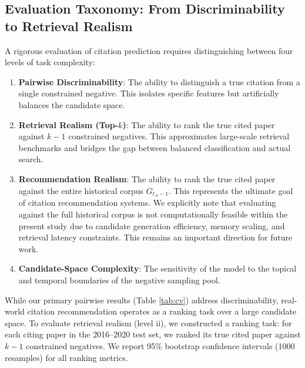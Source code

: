 \documentclass[11pt,a4paper]{article}
\begin{document}
\subsection{Evaluation Taxonomy: From Discriminability to Retrieval Realism}
A rigorous evaluation of citation prediction requires distinguishing between four levels of task complexity:
\begin{enumerate}
    \item \textbf{Pairwise Discriminability}: The ability to distinguish a true citation from a single constrained negative. This isolates specific features but artificially balances the candidate space.
    \item \textbf{Retrieval Realism (Top-$k$)}: The ability to rank the true cited paper against $k-1$ constrained negatives. This approximates large-scale retrieval benchmarks and bridges the gap between balanced classification and actual search.
    \item \textbf{Recommendation Realism}: The ability to rank the true cited paper against the entire historical corpus $G_{t_A-1}$. This represents the ultimate goal of citation recommendation systems. We explicitly note that evaluating against the full historical corpus is not computationally feasible within the present study due to candidate generation efficiency, memory scaling, and retrieval latency constraints. This remains an important direction for future work.
    \item \textbf{Candidate-Space Complexity}: The sensitivity of the model to the topical and temporal boundaries of the negative sampling pool.
\end{enumerate}

While our primary pairwise results (Table \ref{tab:cv}) address discriminability, real-world citation recommendation operates as a ranking task over a large candidate space. To evaluate retrieval realism (level ii), we constructed a ranking task: for each citing paper in the 2016--2020 test set, we ranked its true cited paper against $k-1$ constrained negatives. We report 95\% bootstrap confidence intervals (1000 resamples) for all ranking metrics.
\end{document}
